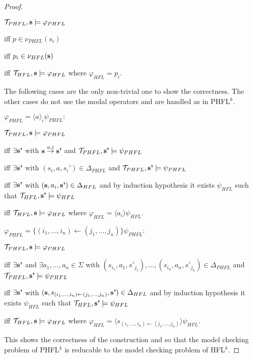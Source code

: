 \begin{proof}
\begin{compactitem}
        $\mathcal{T}_{PHFL}, \emph{s} \models \varphi_{PHFL}$

        iff $p \in \nu_{PHFL}(s_i)$

        iff $p_i \in \nu_{HFL}(\emph{s})$

        iff $\mathcal{T}_{HFL}, \emph{s} \models \varphi_{HFL}$ where $\varphi_{HFL} = p_i$.
    \end{compactitem}

    The following cases are the only non-trivial one to show the correctness. The other cases do not use the
    modal operators and are handled as in PHFL$^k$.

    \begin{compactitem}
        \item $\varphi_{PHFL} = \langle a \rangle_i \psi_{PHFL} \colon $

        $\mathcal{T}_{PHFL}, \emph{s} \models \varphi_{PHFL}$

        iff $\exists \emph{s'}$ with $\emph{s} \overset{a, i}{\rightarrow} \emph{s'}$ and $\mathcal{T}_{PHFL}, \emph{s'}
        \models \psi_{PHFL}$

        iff $\exists \emph{s'}$ with $(s_i, a, {s_i}') \in \Delta_{PHFL}$ and $\mathcal{T}_{PHFL}, \emph{s'}
        \models \psi_{PHFL}$

        iff $\exists \emph{s'}$ with $(\emph{s}, a_i, \emph{s'}) \in \Delta_{HFL}$ and by induction hypothesis it
        exists $\psi_{HFL}$ such that $\mathcal{T}_{HFL}, \emph{s'} \models \psi_{HFL}$

        iff $\mathcal{T}_{HFL}, \emph{s} \models \varphi_{HFL}$ where $\varphi_{HFL} = \langle a_i \rangle \psi_{HFL}$.
        \item $\varphi_{PHFL} = \{(i_1, \dots, i_n) \leftarrow (j_1, \dots, j_n)\} \psi_{PHFL} \colon $

        $\mathcal{T}_{PHFL}, \emph{s} \models \varphi_{PHFL}$

        iff $\exists \emph{s'}$ and $\exists a_1, \dots, a_n \in \Sigma$ with $(s_{i_1}, a_1, {s'}_{j_1}), \dots,
        (s_{i_n}, a_n, {s'}_{j_n}) \in \Delta_{PHFL}$ and $\mathcal{T}_{PHFL}, \emph{s'} \models \psi_{PHFL}$

        iff $\exists \emph{s'}$ with $(\emph{s}, s_{(i_1, \dots, i_n) \leftarrow (j_1, \dots, j_n)}, \emph{s'}) \in
        \Delta_{HFL}$ and by induction hypothesis it exists $\psi_{HFL}$ such that $\mathcal{T}_{HFL}, \emph{s'}
        \models \psi_{HFL}$

        iff $\mathcal{T}_{HFL}, \emph{s} \models \varphi_{HFL}$ where $\varphi_{HFL} = \langle s_{(i_1, \dots, i_n)
        \leftarrow (j_1, \dots, j_n)} \rangle \psi_{HFL}$.
    \end{compactitem}
    This shows the correctness of the construction and so that the model checking problem of PHFL$^k$ is reducable to
    the model checking problem of HFL$^k$.
\end{proof}

